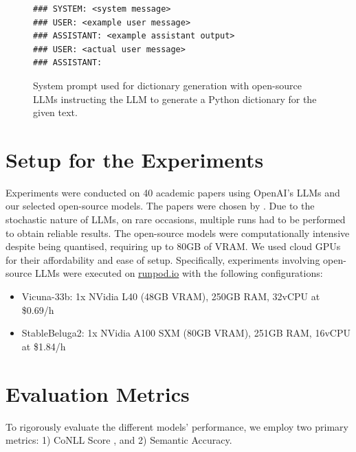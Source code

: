 \begin{figure}[htpb]
  \centering
  \begin{lstlisting}
### SYSTEM: <system message>
### USER: <example user message>
### ASSISTANT: <example assistant output>
### USER: <actual user message>
### ASSISTANT:
  \end{lstlisting}
  \caption[System Prompt for Annotation]{System prompt used for dictionary generation with open-source LLMs instructing the LLM to generate a Python dictionary for the given text.}\label{fig:open-source-prompt-structure}
\end{figure}

\section{Setup for the Experiments}

Experiments were conducted on 40 academic papers using OpenAI's LLMs and our selected open-source models. The papers were chosen by \citet{asakura2022building}. Due to the stochastic nature of LLMs, on rare occasions, multiple runs had to be performed to obtain reliable results. The open-source models were computationally intensive despite being quantised, requiring up to 80GB of \ac{VRAM}. We used cloud \ac{GPU}s for their affordability and ease of setup. Specifically, experiments involving open-source LLMs were executed on \href{https://runpod.io}{runpod.io} with the following configurations:

\begin{itemize}
    \item Vicuna-33b: 1x NVidia L40 (48GB VRAM), 250GB RAM, 32vCPU at \$0.69/h
    \item StableBeluga2: 1x NVidia A100 SXM (80GB VRAM), 251GB RAM, 16vCPU at \$1.84/h
\end{itemize}

\section{Evaluation Metrics}

To rigorously evaluate the different models' performance, we employ two primary metrics: 1) CoNLL Score \citep{pradhan2012conll}, and 2) Semantic Accuracy.

